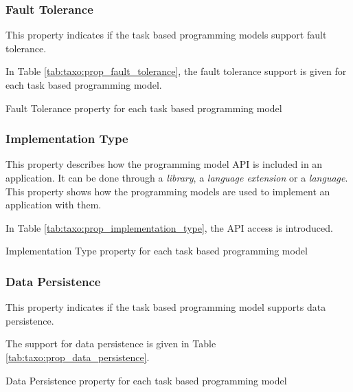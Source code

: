 \subsubsection{Fault Tolerance}
This property indicates if the task based programming models support fault tolerance.

In Table \ref{tab:taxo:prop_fault_tolerance}, the fault tolerance support is given for each task based programming model.
\begin{table}[H]
	\caption{Fault Tolerance property for each task based programming model \label{tab:taxo:prop_fault_tolerance}}
	\centering
	\begin{multicols}{2}
		

		
	\end{multicols}
\end{table}

\subsubsection{Implementation Type}
This property describes how the programming model API is included in an application.
It can be done through a \textit{library}, a \textit{language extension} or a \textit{language}.
This property shows how the programming models are used to implement an application with them.

In Table \ref{tab:taxo:prop_implementation_type}, the API access is introduced.
\begin{table}[H]
	\caption{Implementation Type property for each task based programming model \label{tab:taxo:prop_implementation_type}}
	\centering
	\begin{multicols}{2}
		

		
	\end{multicols}
\end{table}

\subsubsection{Data Persistence}
This property indicates if the task based programming model supports data persistence.

The support for data persistence is given in Table \ref{tab:taxo:prop_data_persistence}.
\begin{table}[H]
	\caption{Data Persistence property for each task based programming model \label{tab:taxo:prop_data_persistence}}
	\centering
	\begin{multicols}{2}
		

		
	\end{multicols}
\end{table}

